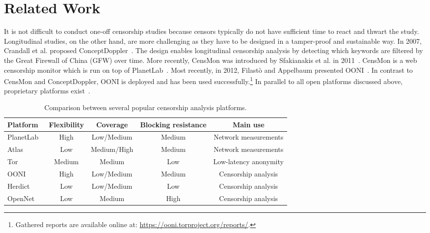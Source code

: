 \section{Related Work}
\label{related_work}

It is not difficult to conduct one-off censorship studies because censors
typically do not have sufficient time to react and thwart the study.
Longitudinal studies, on the other hand, are more challenging as they have to
be designed in a tamper-proof and sustainable way.  In 2007, Crandall et al.
proposed ConceptDoppler~\cite{Crandall2007}.  The design enables longitudinal
censorship analysis by detecting which keywords are filtered by the Great
Firewall of China (GFW) over time.  More recently, CensMon was introduced by
Sfakianakis et al. in 2011~\cite{Sfakianakis2011}.  CensMon is a web censorship
monitor which is run on top of PlanetLab~\cite{planetlab}.  Most recently, in
2012, Filast\`{o} and Appelbaum presented OONI~\cite{Filasto2012}.  In
contrast to CensMon and ConceptDoppler, OONI is deployed and has been used
successfully.\footnote{Gathered reports are available online at:
\url{https://ooni.torproject.org/reports/}.}  In parallel to all open platforms
discussed above, proprietary platforms exist~\cite{hwang2007herdict,opennet}.

\begin{table*}[ht!]
\centering
\begin{tabular}{l|cccc}
\textbf{Platform} & \textbf{Flexibility} & \textbf{Coverage} &
\textbf{Blocking resistance} & \textbf{Main use} \\
\hline 
PlanetLab~\cite{planetlab} & High & Low/Medium & Medium & Network measurements \\
Atlas~\cite{atlas} & Low & Medium/High & Medium & Network measurements \\
Tor~\cite{Dingledine2004} & Medium & Medium & Low & Low-latency anonymity \\
OONI~\cite{Filasto2012} & High & Low/Medium & Medium & Censorship analysis \\
Herdict~\cite{Herdict} & Low & Low/Medium & Low & Censorship analysis \\
OpenNet~\cite{opennet} & Low & Medium & High & Censorship analysis \\
\hline 
\end{tabular} 
\caption{Comparison between several popular censorship analysis platforms.}
\label{tab:comparison}
\end{table*}

